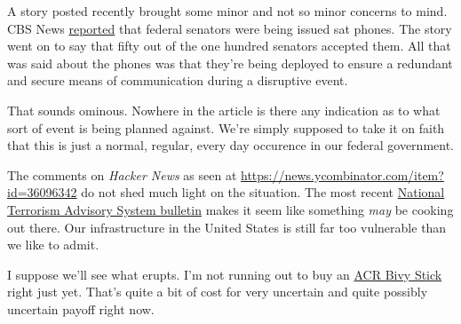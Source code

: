 A story posted recently brought some minor and not so minor concerns to
mind. CBS News
\href{https://web.archive.org/web/20230528070548/https://www.cbsnews.com/news/senators-issued-satellite-phones-new-security-measures/}{reported}
that federal senators were being issued sat phones. The story went on to
say that fifty out of the one hundred senators accepted them. All that
was said about the phones was that they're being deployed to ensure a
redundant and secure means of communication during a disruptive event.

That sounds ominous. Nowhere in the article is there any indication as
to what sort of event is being planned against. We're simply supposed to
take it on faith that this is just a normal, regular, every day
occurence in our federal government.

The comments on \emph{Hacker News} as seen at
\url{https://news.ycombinator.com/item?id=36096342} do not shed much
light on the situation. The most recent
\href{https://web.archive.org/web/20230529132640/https://www.dhs.gov/sites/default/files/ntas/alerts/23_0524_S1_NTAS-Bulletin-508.pdf}{National
Terrorism Advisory System bulletin} makes it seem like something
\emph{may} be cooking out there. Our infrastructure in the United States
is still far too vulnerable than we like to admit.

I suppose we'll see what erupts. I'm not running out to buy an
\href{https://web.archive.org/web/20230503042400/https://bivystick.com/}{ACR
Bivy Stick} right just yet. That's quite a bit of cost for very
uncertain and quite possibly uncertain payoff right now.
